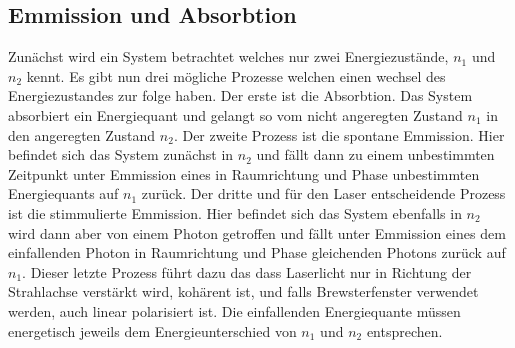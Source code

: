 \subsection{Emmission und Absorbtion}
\label{sec:EmmissionUndAbsorbtion}
Zunächst wird ein System betrachtet welches nur zwei Energiezustände, $n_1$ und $n_2$ kennt.
Es gibt nun drei mögliche Prozesse welchen einen wechsel des Energiezustandes zur folge haben.
Der erste ist die Absorbtion. Das System absorbiert ein Energiequant und gelangt so vom nicht 
angeregten Zustand $n_1$ in den angeregten Zustand $n_2$. Der zweite Prozess ist die spontane
Emmission. Hier befindet sich das System zunächst in $n_2$ und fällt dann zu einem unbestimmten 
Zeitpunkt unter Emmission eines in Raumrichtung und Phase unbestimmten Energiequants auf $n_1$ zurück.
Der dritte und für den Laser entscheidende Prozess ist die stimmulierte Emmission. Hier befindet sich 
das System ebenfalls in $n_2$ wird dann aber von einem Photon getroffen und fällt unter Emmission
eines dem einfallenden Photon in Raumrichtung und Phase gleichenden Photons zurück auf $n_1$. Dieser letzte
Prozess führt dazu das dass Laserlicht nur in Richtung der Strahlachse verstärkt wird, kohärent ist, und
falls Brewsterfenster verwendet werden, auch linear polarisiert ist. Die einfallenden Energiequante müssen 
energetisch jeweils dem Energieunterschied von $n_1$ und $n_2$ entsprechen.


